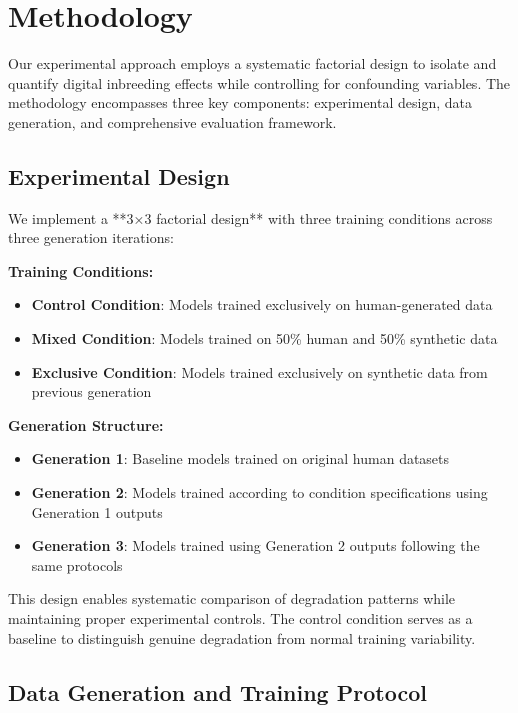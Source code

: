 \documentclass{article}
\begin{document}
\section{Methodology}

Our experimental approach employs a systematic factorial design to isolate and quantify digital inbreeding effects while controlling for confounding variables. The methodology encompasses three key components: experimental design, data generation, and comprehensive evaluation framework.

\subsection{Experimental Design}

We implement a **3×3 factorial design** with three training conditions across three generation iterations:

\textbf{Training Conditions:}
\begin{itemize}
\item \textbf{Control Condition}: Models trained exclusively on human-generated data
\item \textbf{Mixed Condition}: Models trained on 50\% human and 50\% synthetic data 
\item \textbf{Exclusive Condition}: Models trained exclusively on synthetic data from previous generation
\end{itemize}

\textbf{Generation Structure:}
\begin{itemize}
\item \textbf{Generation 1}: Baseline models trained on original human datasets
\item \textbf{Generation 2}: Models trained according to condition specifications using Generation 1 outputs
\item \textbf{Generation 3}: Models trained using Generation 2 outputs following the same protocols
\end{itemize}

This design enables systematic comparison of degradation patterns while maintaining proper experimental controls. The control condition serves as a baseline to distinguish genuine degradation from normal training variability.

\subsection{Data Generation and Training Protocol}
\end{document}
